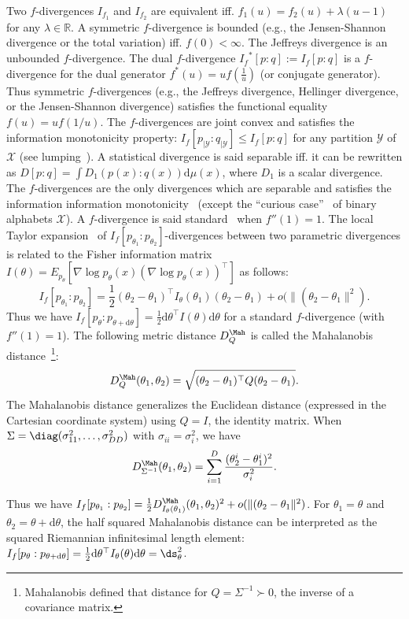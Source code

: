 \documentclass[11pt]{article}
\def\calY{\mathcal{Y}}
\def\dmu{\mathrm{d}\mu}
\def\calX{\mathcal{X}}
\def\bbR{\mathbb{R}}
\def\calX{\mathcal{X}}
\def\dmu{\mathrm{d}\mu}
\def\dtheta{\mathrm{d}\theta}
\begin{document}
Two $f$-divergences $I_{f_1}$ and $I_{f_2}$ are equivalent iff. $f_1(u)=f_2(u)+\lambda (u-1)$ for any $\lambda\in\bbR$.
A symmetric $f$-divergence is bounded (e.g., the Jensen-Shannon divergence or the total variation) iff. $f(0)<\infty$. 
The Jeffreys divergence is an unbounded $f$-divergence.
The dual $f$-divergence ${I_f}^*[p:q]:=I_f[p:q]$ is a $f$-divergence for the dual generator $f^*(u)= u f\left(\frac{1}{u}\right)$ (or conjugate generator).
Thus symmetric $f$-divergences (e.g., the Jeffreys divergence, Hellinger divergence, or the Jensen-Shannon divergence) satisfies the functional equality $f(u)=uf(1/u)$.
The $f$-divergences are joint convex and satisfies the information monotonicity property:
$I_f[p_{|\calY}:q_{|\calY}]\leq I_f[p:q]$ for any partition $\calY$ of $\calX$ (see lumping~\cite{TutorialCsiszar-2004}).
A statistical divergence is said separable iff. it can be rewritten as $D[p:q]=\int D_1(p(x):q(x)) \dmu(x)$, where $D_1$ is a scalar divergence. The $f$-divergences are the only divergences which are separable and satisfies the information information monotonicity~\cite{IG-2016} (except the ``curious case''~\cite{fdivBinaryAlphabet-2014} of binary alphabets $\calX$).
A $f$-divergence is said standard~\cite{IG-2016} when $f''(1)=1$. 
The local Taylor expansion~\cite{CharacterizationDiv-1998} of $I_f[p_{\theta_1}:p_{\theta_2}]$-divergences between two parametric divergences is related to the Fisher information matrix $I(\theta)=E_{p_\theta}\left[\nabla \log p_\theta(x) (\nabla \log p_\theta(x))^\top\right]$ as follows:
$$
I_f[p_{\theta_1}:p_{\theta_2}]=\frac{1}{2}(\theta_2-\theta_1)^\top I_\theta(\theta_1)(\theta_2-\theta_1)+o(\|(\theta_2-\theta_1\|^2).
$$ 
Thus we have $I_f[p_{\theta}:p_{\theta+\dtheta}]=\frac{1}{2}\dtheta^\top I(\theta) \dtheta$ for a standard $f$-divergence (with $f''(1)=1$).
The following metric distance $D^\Mah_Q$ is called the Mahalanobis distance~\cite{Mahalanobis-1936}\footnote{Mahalanobis defined that distance for $Q=\Sigma^{-1}\succ 0$, the inverse of a covariance matrix.}:
$$
D^\Mah_Q(\theta_1,\theta_2)=\sqrt{(\theta_2-\theta_1)^\top Q(\theta_2-\theta_1)}.
$$
The  Mahalanobis distance generalizes the Euclidean distance (expressed in the Cartesian coordinate system) using $Q=I$, the identity matrix.
When $\Sigma=\diag(\sigma_{11}^2,\ldots, \sigma_{DD}^2)$ with $\sigma_{ii}=\sigma_i^2$, we have
$$
D^\Mah_{\Sigma^{-1}}(\theta_1,\theta_2)=\sum_{i=1}^D \frac{(\theta_2^i-\theta_1^i)^2}{\sigma_{i}^2}.
$$

Thus we have $I_f[p_{\theta_1}:p_{\theta_2}]=\frac{1}{2}D^\Mah_{I_\theta(\theta_1)}(\theta_1,\theta_2)^2+o(\|(\theta_2-\theta_1\|^2)$.
For $\theta_1=\theta$ and $\theta_2=\theta+\dtheta$, the half squared Mahalanobis distance can be interpreted as the squared Riemannian infinitesimal length element: $I_f[p_{\theta}:p_{\theta+\dtheta}]=\frac{1}{2}\dtheta^\top I_\theta(\theta) \dtheta=\ds_\theta^2$.
\end{document}
